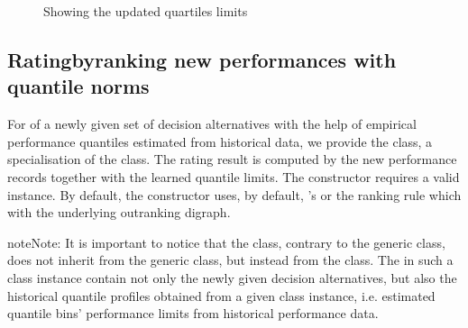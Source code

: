 \documentclass[a4paper,12pt,english]{sphinxhowto}
\let\sphinxpxdimen\pdfpxdimen\else\newdimen\sphinxpxdimen
\begin{document}
\begin{figure}[H]
\centering
\capstart

\noindent\sphinxincludegraphics[width=400\sphinxpxdimen]{{examplePerfQuantiles}.png}
\caption{Showing the updated quartiles limits}\label{\detokenize{tutorial:exampleperfquantiles}}\end{figure}


\subsection{Rating\sphinxhyphen{}by\sphinxhyphen{}ranking new performances with quantile norms}
\label{\detokenize{tutorial:rating-by-ranking-new-performances-with-quantile-norms}}
For   of a newly given set of decision alternatives with the help of empirical performance quantiles estimated from historical data, we provide the  class, a specialisation of the  class. The rating result is computed by  the new performance records together with the learned quantile limits. The constructor requires a valid  instance. By default, the constructor uses, by default, ’s or the  ranking rule which  with the underlying outranking digraph.

\begin{sphinxadmonition}{note}{Note:}
It is important to notice that the  class, contrary to the generic  class, does not inherit from the generic  class, but instead from the  class. The  in such a  class instance contain not only the newly given decision alternatives, but also the historical quantile profiles obtained from a given  class instance, i.e. estimated quantile bins’ performance limits from historical performance data.
\end{sphinxadmonition}
\end{document}
